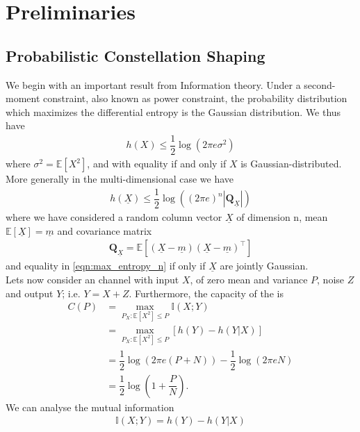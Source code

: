 \chapter{Preliminaries}\label{chap:preliminaries}
\section{Probabilistic Constellation Shaping}
We begin with an important result from Information theory. Under a second-moment constraint, also known as power constraint, the probability distribution which maximizes the differential entropy is the Gaussian distribution. We thus have
\begin{align}
\label{eqn:max_entropy_scalar}
	h(X) \leq \dfrac{1}{2} \log \left(2 \pi e \sigma^2 \right)
\end{align}
where $\sigma^2 = \mathbb{E}[X^2]$, and with equality if and only if $X$ is Gaussian-distributed. More generally in the multi-dimensional case we have  
\begin{align}
\label{eqn:max_entropy_n}
	h(\underline{X}) \leq \dfrac{1}{2} \log \left((2 \pi e)^n |\textbf{Q}_{\underline{X}}| \right)
\end{align}
where we have considered a random column vector $\underline{X}$ of dimension n, mean $\mathbb{E}[\underline{X}]= \underline{m}$ and covariance matrix
\begin{align}
	\textbf{Q}_{\underline{X}}  = \mathbb{E}[(\underline{X} - \underline{m})(\underline{X} - \underline{m})^\intercal]
\end{align}
and equality in \ref{eqn:max_entropy_n} if only if $\underline{X}$ are jointly Gaussian.\\
Lets now consider an  channel with input $X$, of zero mean and variance $P$, noise $Z$ and output $Y$; i.e. $Y = X + Z$. Furthermore, the capacity of the  is
\begin{align}
\label{eqn:awgn_cap}
	C(P) &= \max\limits_{P_X:\mathbb{E}[X^2] \leq P} \mathbb{I}(X;Y)\\
	& = \max\limits_{P_X:\mathbb{E}[X^2] \leq P}[h(Y) - h(Y \vert X)]\\
	& = \dfrac{1}{2} \log (2 \pi e (P+N)) - \dfrac{1}{2} \log (2 \pi e N)\\
	& = \dfrac{1}{2} \log \left(1 + \dfrac{P}{N} \right). 
\end{align}
We can analyse the mutual information
\begin{align}
\label{eqn:MI}
	\mathbb{I}(X;Y) = h(Y) - h(Y \vert X)
\end{align}
